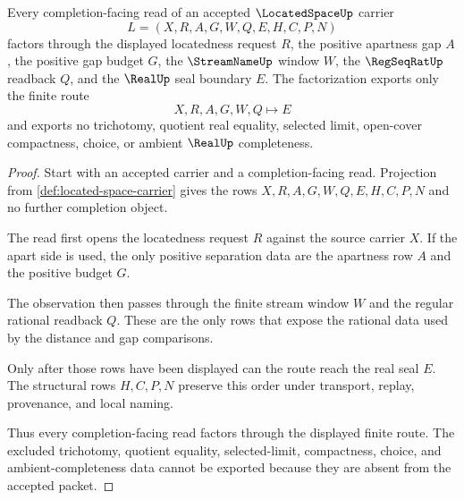 \begin{theorem}
\label{thm:located-space-real-completion-boundary}
Every completion-facing read of an accepted $\LocatedSpaceUp$ carrier
$$
L=(X,R,A,G,W,Q,E,H,C,P,N)
$$
factors through the displayed locatedness request $R$, the positive apartness gap $A$, the positive gap budget $G$, the $\StreamNameUp$ window $W$, the $\RegSeqRatUp$ readback $Q$, and the $\RealUp$ seal boundary $E$. The factorization exports only the finite route
$$
X,R,A,G,W,Q \longmapsto E
$$
and exports no trichotomy, quotient real equality, selected limit, open-cover compactness, choice, or ambient $\RealUp$ completeness.
\end{theorem}
\begin{proof}
Start with an accepted carrier and a completion-facing read. Projection from \autoref{def:located-space-carrier} gives the rows $X,R,A,G,W,Q,E,H,C,P,N$ and no further completion object.

The read first opens the locatedness request $R$ against the source carrier $X$. If the apart side is used, the only positive separation data are the apartness row $A$ and the positive budget $G$.

The observation then passes through the finite stream window $W$ and the regular rational readback $Q$. These are the only rows that expose the rational data used by the distance and gap comparisons.

Only after those rows have been displayed can the route reach the real seal $E$. The structural rows $H,C,P,N$ preserve this order under transport, replay, provenance, and local naming.

Thus every completion-facing read factors through the displayed finite route. The excluded trichotomy, quotient equality, selected-limit, compactness, choice, and ambient-completeness data cannot be exported because they are absent from the accepted packet.
\end{proof}

